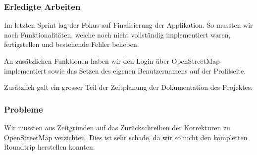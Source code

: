 \subsubsection{Erledigte Arbeiten}

Im letzten Sprint lag der Fokus auf Finalisierung der Applikation.
So mussten wir noch Funktionalitäten, welche noch nicht vollständig implementiert waren, fertigstellen und bestehende Fehler beheben.

An zusätzlichen Funktionen haben wir den Login über OpenStreetMap implementiert sowie das Setzen des eigenen Benutzernamens auf der Profilseite.

Zusätzlich galt ein grosser Teil der Zeitplanung der Dokumentation des Projektes.

\subsubsection{Probleme}
Wir mussten aus Zeitgründen auf das Zurückschreiben der Korrekturen zu \gls{OpenStreetMap} verzichten.
Dies ist sehr schade, da wir so nicht den kompletten Roundtrip herstellen konnten.